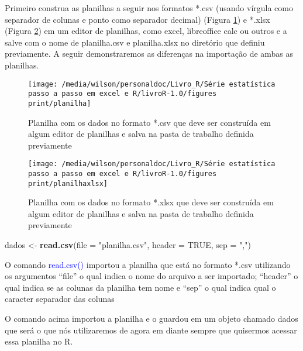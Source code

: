 \documentclass[14pt,titlepage, oneside, openany, a4paper]{book}
\newenvironment{Shaded}{\begin{snugshade}}{\end{snugshade}}
\newcommand{\DataTypeTok}[1]{\textcolor[rgb]{0.13,0.29,0.53}{#1}}
\newcommand{\KeywordTok}[1]{\textcolor[rgb]{0.13,0.29,0.53}{\textbf{#1}}}
\newcommand{\NormalTok}[1]{#1}
\newcommand{\OtherTok}[1]{\textcolor[rgb]{0.56,0.35,0.01}{#1}}
\newcommand{\StringTok}[1]{\textcolor[rgb]{0.31,0.60,0.02}{#1}}
\begin{document}
Primeiro construa as planilhas a seguir nos formatos *.csv (usando vírgula como separador de colunas e ponto como separador decimal) (Figura \ref{fig:planilha}) e *.xlsx (Figura \ref{fig:planilhaxlsx}) em um editor de planilhas, como excel, libreoffice calc ou outros e a salve com o nome de planilha.csv e planilha.xlsx no diretório que definiu previamente. A seguir demonstraremos as diferenças na importação de ambas as planilhas.

\begin{figure}[H]
\texttt{[image: /media/wilson/personaldoc/Livro\_R/Série estatística passo a passo em excel e R/livroR-1.0/figures print/planilha]} \caption{Planilha com os dados no formato *.csv que deve ser construída em algum editor de planilhas e salva na pasta de trabalho definida previamente}\label{fig:planilha}
\end{figure}

\begin{figure}[H]
\texttt{[image: /media/wilson/personaldoc/Livro\_R/Série estatística passo a passo em excel e R/livroR-1.0/figures print/planilhaxlsx]} \caption{Planilha com os dados no formato *.xlsx que deve ser construída em algum editor de planilhas e salva na pasta de trabalho definida previamente}\label{fig:planilhaxlsx}
\end{figure}

\begin{Shaded}
\begin{Highlighting}[]
\NormalTok{dados <-}\StringTok{ }\KeywordTok{read.csv}\NormalTok{(}\DataTypeTok{file =} \StringTok{"planilha.csv"}\NormalTok{, }\DataTypeTok{header =} \OtherTok{TRUE}\NormalTok{, }\DataTypeTok{sep =} \StringTok{","}\NormalTok{)}
\end{Highlighting}
\end{Shaded}

O comando \textcolor{blue}{read.csv()} importou a planilha que está no formato *.csv utilizando os argumentos ``file'' o qual indica o nome do arquivo a ser importado; ``header'' o qual indica se as colunas da planilha tem nome e ``sep'' o qual indica qual o caracter separador das colunas

O comando acima importou a planilha e o guardou em um objeto chamado dados que será o que nós utilizaremos de agora em diante sempre que quisermos acessar essa planilha no R.
\end{document}
